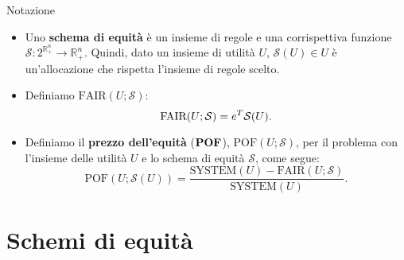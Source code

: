 \documentclass{beamer}
\begin{document}
\begin{frame}
	\begin{block}{Notazione}
		\begin{itemize}
		\item Uno \textbf{schema di equità} è un insieme di regole e una corrispettiva funzione $\mathcal{S}: 2^{\mathbb{R}^{n}_{+}} \rightarrow \mathbb{R}^{n}_{+}$. Quindi, dato un insieme di utilità $U$, $\mathcal{S}(U) \in U$ è un'allocazione che rispetta l'insieme di regole scelto.\\
		\item Definiamo $\text{FAIR}(U; \mathcal{S})$:
		\vspace{-0.3cm}
		\begin{equation}
			\text{FAIR}(U; \mathcal{S}) = e^T \mathcal{S}(U).
			\vspace{-0.3cm}
		\end{equation}
		\item Definiamo il \textbf{prezzo dell'equità} ($\text{\textbf{POF}}$), $\text{POF}(U; \mathcal{S})$, per il problema con l'insieme delle utilità $U$ e lo schema di equità $\mathcal{S}$, come segue:
		\vspace{-0.3cm}
			\begin{equation}
				\text{POF}(U;\mathcal{S}(U)) = \frac{\text{SYSTEM}(U) - \text{FAIR}(U;\mathcal{S})}{\text{SYSTEM}(U)}.
			\end{equation}
		\end{itemize}
		\vspace{-0.2cm}
	\end{block}
\end{frame}

\section{Schemi di equità}

\end{document}
